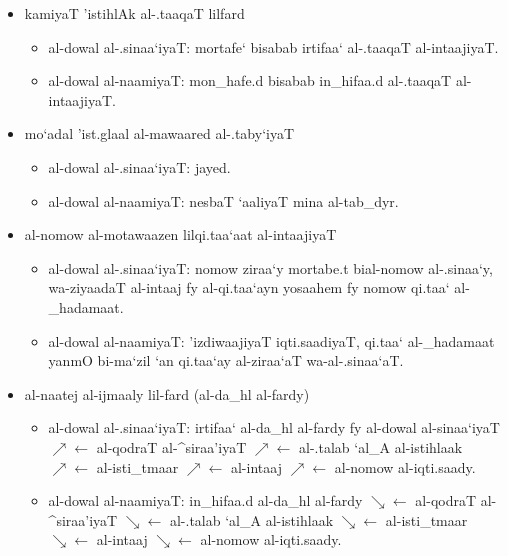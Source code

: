 \begin{itemize}
    \item kamiyaT 'istihlAk al-.taaqaT lilfard
    \begin{itemize}
        \item al-dowal al-.sinaa`iyaT: mortafe` bisabab irtifaa` al-.taaqaT
            al-intaajiyaT.
        \item al-dowal al-naamiyaT: mon_hafe.d bisabab in_hifaa.d al-.taaqaT
            al-intaajiyaT.
    \end{itemize}
\end{itemize}
\begin{itemize}
    \item mo`adal 'ist.glaal al-mawaared al-.taby`iyaT
    \begin{itemize}
        \item al-dowal al-.sinaa`iyaT: jayed.
        \item al-dowal al-naamiyaT: nesbaT `aaliyaT mina al-tab_dyr.
    \end{itemize}
\end{itemize}
\begin{itemize}
    \item al-nomow al-motawaazen lilqi.taa`aat al-intaajiyaT
    \begin{itemize}
        \item al-dowal al-.sinaa`iyaT: nomow ziraa`y mortabe.t bial-nomow
            al-.sinaa`y, wa-ziyaadaT al-intaaj fy al-qi.taa`ayn yosaahem fy
            nomow qi.taa` al-_hadamaat.
        \item al-dowal al-naamiyaT: 'izdiwaajiyaT iqti.saadiyaT, qi.taa`
            al-_hadamaat yanmO bi-ma`zil `an qi.taa`ay al-ziraa`aT
            wa-al-.sinaa`aT.
    \end{itemize}
\end{itemize}
\begin{itemize}
    \item al-naatej al-ijmaaly lil-fard (al-da_hl al-fardy)
    \begin{itemize}
        \item al-dowal al-.sinaa`iyaT: irtifaa` al-da_hl al-fardy fy al-dowal
            al-sinaa`iyaT
            $\nearrow\leftarrow$ al-qodraT al-^siraa'iyaT
            $\nearrow\leftarrow$ al-.talab `al_A al-istihlaak
            $\nearrow\leftarrow$ al-isti_tmaar
            $\nearrow\leftarrow$ al-intaaj
            $\nearrow\leftarrow$ al-nomow al-iqti.saady.
        \item al-dowal al-naamiyaT: in_hifaa.d al-da_hl al-fardy
            $\searrow\leftarrow$ al-qodraT al-^siraa'iyaT
            $\searrow\leftarrow$ al-.talab `al_A al-istihlaak
            $\searrow\leftarrow$ al-isti_tmaar
            $\searrow\leftarrow$ al-intaaj
            $\searrow\leftarrow$ al-nomow al-iqti.saady.
    \end{itemize}
\end{itemize}
